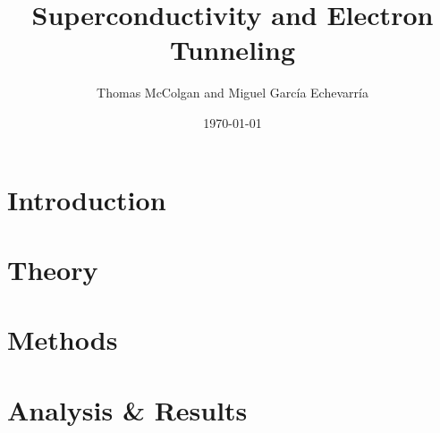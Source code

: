 \documentclass[8pt]{beamer}
\title{\textbf{Superconductivity and Electron Tunneling}}
\author{Thomas McColgan and Miguel Garc\'ia Echevarr\'ia}
\date{\today}
\begin{document}
\frame{\titlepage}

\section{Introduction}


\section{Theory}


\section{Methods}


\section{Analysis \& Results}

\end{document}
